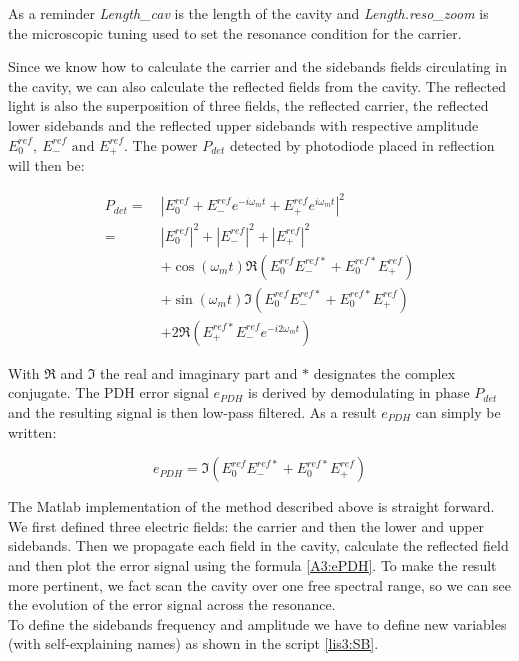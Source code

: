 As a reminder \textsl{Length\_cav} is the length of the cavity and \textsl{Length.reso\_zoom} is the microscopic tuning used to set the resonance condition for the carrier.

Since we know how to calculate the carrier and the sidebands fields circulating in the cavity, we can also calculate the reflected fields from the cavity. The reflected light is also the superposition of three fields, the reflected carrier, the reflected lower sidebands and the reflected upper sidebands with respective amplitude $E_0^{ref},\ E_-^{ref} \text{ and } E_+^{ref}$. The power $P_{det}$ detected by photodiode placed in reflection will then be:

\begin{equation}
\begin{split}
P_{det} =\ & |E_0^{ref} +  E_-^{ref}e^{-i \omega_m t} + E_+^{ref}e^{i \omega_m t}|^2 \\
     =\ & |E_0^{ref}|^2 + |E_-^{ref}|^2 + |E_+^{ref}|^2\\
    & + \cos(\omega_m t) \Re(E_0^{ref}E_-^{ref \ast}+E_0^{ref \ast}E_+^{ref})\\
    & + \sin(\omega_m t) \Im(E_0^{ref}E_-^{ref \ast}+E_0^{ref \ast}E_+^{ref})\\
    & + 2 \Re(E_+^{ref \ast}E_-^{ref} e^{-i 2\omega_m t})
\end{split}
\end{equation}

With $\Re$ and $\Im$ the real and imaginary part and $\ast$ designates the complex conjugate. The PDH error signal $e_{PDH}$ is derived by demodulating in phase $P_{det}$ and the resulting signal is then low-pass filtered. As a result $e_{PDH}$ can simply be written:

\begin{equation}
e_{PDH} = \Im(E_0^{ref}E_-^{ref \ast}+E_0^{ref \ast}E_+^{ref})
\label{A3:ePDH}
\end{equation}

The Matlab implementation of the method described above is straight forward. We first defined three electric fields: the carrier and then the lower and upper sidebands. Then we propagate each field in the cavity, calculate the reflected field and then plot the error signal using the formula \ref{A3:ePDH}. To make the result more pertinent, we fact scan the cavity over one free spectral range, so we can see the evolution of the error signal across the resonance.\\

To define the sidebands frequency and amplitude we have to define new variables (with self-explaining names) as shown in the script \ref{lis3:SB}.\\

